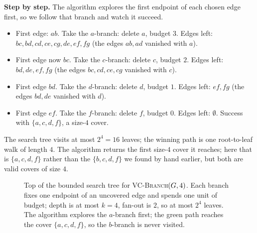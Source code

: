 \begin{labbox}
\textbf{Step by step.} The algorithm explores the first endpoint of each chosen edge first, so we follow that branch and watch it succeed.
\begin{itemize}
  \item First edge: $ab$. Take the $a$-branch: delete $a$, budget $3$. Edges left: $bc,bd,cd,ce,cg,de,ef,fg$ (the edges $ab,ad$ vanished with $a$).
  \item First edge now $bc$. Take the $c$-branch: delete $c$, budget $2$. Edges left: $bd,de,ef,fg$ (the edges $bc,cd,ce,cg$ vanished with $c$).
  \item First edge $bd$. Take the $d$-branch: delete $d$, budget $1$. Edges left: $ef,fg$ (the edges $bd,de$ vanished with $d$).
  \item First edge $ef$. Take the $f$-branch: delete $f$, budget $0$. Edges left: $\emptyset$. Success with $\{a,c,d,f\}$, a size-$4$ cover.
\end{itemize}
The search tree visits at most $2^4=16$ leaves; the winning path is one root-to-leaf walk of length $4$. The algorithm returns the first size-$4$ cover it reaches; here that is $\{a,c,d,f\}$ rather than the $\{b,c,d,f\}$ we found by hand earlier, but both are valid covers of size $4$.
\end{labbox}

\begin{figure}[H]
\centering
{}
\caption{Top of the bounded search tree for \textsc{VC-Branch}$(G,4)$. Each branch fixes one endpoint of an uncovered edge and spends one unit of budget; depth is at most $k=4$, fan-out is $2$, so at most $2^4$ leaves. The algorithm explores the $a$-branch first; the green path reaches the cover $\{a,c,d,f\}$, so the $b$-branch is never visited.}
\label{ch25:fig-searchtree}
\end{figure}

